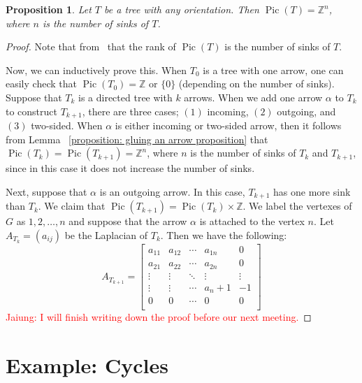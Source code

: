 \documentclass[11pt,reqno]{amsart}
\DeclareMathOperator{\Pic}{Pic}
\theoremstyle{definition}
\theoremstyle{plain}
\newtheorem{pro}[mydef]{\textbf{Proposition}}
\begin{document}
	\begin{pro}
		Let $T$ be a tree with any orientation. Then $\Pic(T)=\mathbb{Z}^n$, where $n$ is the number of sinks of $T$.
	\end{pro}
	\begin{proof}

		Note that from~\cite[Corollary 3.5]{wagner2000critical} that the rank of $\Pic(T)$ is the number of sinks of $T$.

		Now, we can inductively prove this. When $T_0$ is a tree with one arrow, one can easily check that
		$\Pic(T_0) =\mathbb{Z}$ or $\{0\}$ (depending on the number of sinks). Suppose that $T_k$ is a directed tree
		with $k$ arrows. When we add one arrow $\alpha$ to $T_k$ to construct $T_{k+1}$, there are three cases; $(1)$ incoming,
		$(2)$ outgoing, and $(3)$ two-sided. When $\alpha$ is either incoming or two-sided arrow, then it follows from Lemma
		~\ref{proposition: gluing an arrow proposition} that $\Pic(T_k)=\Pic(T_{k+1})=\mathbb{Z}^n$, where $n$ is the
		number of sinks of $T_k$ and $T_{k+1}$, since in this case it does not increase the number of sinks.

		Next, suppose that $\alpha$ is an outgoing arrow. In this case, $T_{k+1}$ has one more sink than $T_{k}$.
		We claim that $\Pic(T_{k+1})=\Pic(T_k)\times \mathbb{Z}$. We label the vertexes of $G$ as $1,2,\dots,n$ and
		suppose that the arrow $\alpha$ is attached to the vertex $n$. Let $A_{T_k}=(a_{ij})$ be the Laplacian of $T_k$.
		Then we have the following:
		\begin{equation}\label{eq: tree case}
			A_{T_{k+1}}=\left[\begin{array}{ccc|c|c}
				a_{11}&a_{12}&\cdots &a_{1n}&0\\
				a_{21}&a_{22}&\cdots &a_{2n}&0\\
				\vdots & \vdots &\ddots & \vdots & \vdots \\ \hline
				\vdots & \vdots & \cdots&a_n+1 & -1\\ \hline
				0&0&\cdots &0&0\\
			\end{array}\right]
		\end{equation}
		\textcolor{red}{Jaiung: I will finish writing down the proof before our next meeting.}
	\end{proof}

\section{Example: Cycles}
\end{document}
